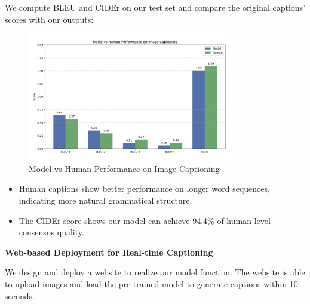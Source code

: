 \documentclass[11pt]{article}
\begin{document}
We compute BLEU and CIDEr on our test set and compare the original captions' scores with our outputs:
\begin{figure}[h]
    \centering
    \includegraphics[width=0.8\textwidth]{f3.png}
    \caption{Model vs Human Performance on Image Captioning}
    \end{figure}
\begin{itemize}
    \item Human captions show better performance on longer word sequences, indicating more natural grammatical structure.
    \item The CIDEr score shows our model can achieve 94.4\% of human-level consensus quality.
\end{itemize}
\pagebreak
\textbf{Web-based Deployment for Real-time Captioning}

We design and deploy a website to realize our model
function. The website is able to upload images and load the pre-trained model to generate 
captions within 10 seconds.
\end{document}
